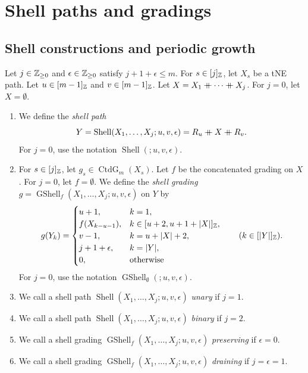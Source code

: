 \section{Shell paths and gradings}\label{sec:shells}
\subsection{Shell constructions and periodic growth}
\begin{definition}\label{def:shell}
Let $j\in\mathbb Z_{\ge0}$ and $\epsilon\in\mathbb Z_{\ge0}$ satisfy $j+1+\epsilon\le m$.
For $s\in[j]_{\mathbb Z}$, let $X_s$ be a tNE path.
Let $u\in[m-1]_{\mathbb Z}$ and $v\in[m-1]_{\mathbb Z}$.
Let $X=X_1\mathbin{+\mkern-10mu+} \cdots\mathbin{+\mkern-10mu+} X_j$.
For $j=0$, let $X=\emptyset$.
\begin{enumerate}[font=\itshape]
\item We define the \textit{shell path}
\[
 Y=\operatorname{Shell}(X_1,\ldots,X_j;u,v,\epsilon)=R_u\mathbin{+\mkern-10mu+} X\mathbin{+\mkern-10mu+} R_v.
\]
For $j=0$, use the notation $\operatorname{Shell}(;u,v,\epsilon)$.
\item For $s\in[j]_{\mathbb Z}$, let $g_s\in\operatorname{CtdG}_m(X_s)$.
Let $f$ be the concatenated grading on $X$.
For $j=0$, let $f=\emptyset$.
We define the \textit{shell grading} $g=\operatorname{GShell}_{f}(X_1,\ldots,X_j;u,v,\epsilon)$ on $Y$ by
\begin{equation}\label{eq:shell}
 g(Y_k)=
 \begin{cases}
 u+1,&k=1,\\
 f(X_{k-u-1}),&k\in[u+2,u+1+|X|]_{\mathbb Z},\\
 v-1,&k=u+|X|+2,\\
 j+1+\epsilon,&k=|Y|,\\
 0,&\text{otherwise}
 \end{cases}
 \qquad(k\in[|Y|]_{\mathbb Z}).
\end{equation}
For $j=0$, use the notation $\operatorname{GShell}_{\emptyset}(;u,v,\epsilon)$.
\item We call a shell path $\operatorname{Shell}(X_1,\ldots,X_j;u,v,\epsilon)$ \textit{unary} if $j=1$.
\item We call a shell path $\operatorname{Shell}(X_1,\ldots,X_j;u,v,\epsilon)$ \textit{binary} if $j=2$.
\item We call a shell grading $\operatorname{GShell}_{f}(X_1,\ldots,X_j;u,v,\epsilon)$ \textit{preserving} if $\epsilon=0$.
\item We call a shell grading $\operatorname{GShell}_{f}(X_1,\ldots,X_j;u,v,\epsilon)$ \textit{draining} if $j=\epsilon=1$.
\end{enumerate}
\end{definition}

